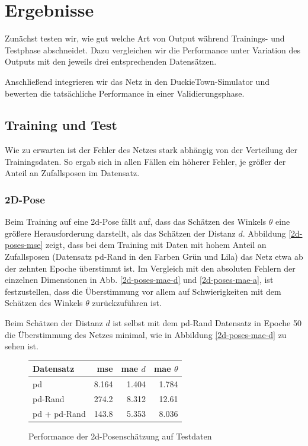 \chapter{Ergebnisse}

Zunächst testen wir, wie gut welche Art von Output während Trainings- und Testphase abschneidet. Dazu vergleichen wir die Performance unter Variation des Outputs mit den jeweils drei entsprechenden Datensätzen. 

Anschließend integrieren wir das Netz in den DuckieTown-Simulator und bewerten die tatsächliche Performance in einer Validierungsphase.

\section{Training und Test}

Wie zu erwarten ist der Fehler des Netzes stark abhängig von der Verteilung der Trainingsdaten. So ergab sich in allen Fällen ein höherer Fehler, je größer der Anteil an Zufallsposen im Datensatz. 

\subsection{2D-Pose}

Beim Training auf eine \acs{2d}-Pose fällt auf, dass das Schätzen des Winkels $\theta$ eine größere Herausforderung darstellt, als das Schätzen der Distanz $d$. Abbildung \ref{2d-poses-mse} zeigt, dass bei dem Training mit Daten mit hohem Anteil an Zufallsposen (Datensatz \glqq\acs{pd}-Rand\grqq{} in den Farben Grün und Lila) das Netz etwa ab der zehnten Epoche überstimmt ist. Im Vergleich mit den absoluten Fehlern der einzelnen Dimensionen in Abb. \ref{2d-poses-mae-d} und \ref{2d-poses-mae-a}, ist festzustellen, dass die Überstimmung vor allem auf Schwierigkeiten mit dem Schätzen des Winkels $\theta$ zurückzuführen ist.

Beim Schätzen der Distanz $d$ ist selbst mit dem \glqq\acs{pd}-Rand\grqq{} Datensatz in Epoche 50 die Überstimmung des Netzes minimal, wie in Abbildung \ref{2d-poses-mae-d} zu sehen ist.


\begin{figure}[H]
	\centering
		\begin{tabular}[t]{|l|r|r|r|}
			\hline
			\textbf{Datensatz} & \textbf{\acs{mse}} & \textbf{\acs{mae}} $d$ & \textbf{\acs{mae}} $\theta$ \\
			\hline
			\acs{pd} & 8.164 & 1.404 & 1.784 \\
			\hline
			\acs{pd}-Rand & 274.2 & 8.312 & 12.61 \\
			\hline
			\acs{pd} + \acs{pd}-Rand & 143.8 & 5.353 & 8.036 \\
			\hline
		\end{tabular}
	\caption{Performance der \acs{2d}-Posenschätzung auf Testdaten}
	\label{2d-pose-performance}
\end{figure}

